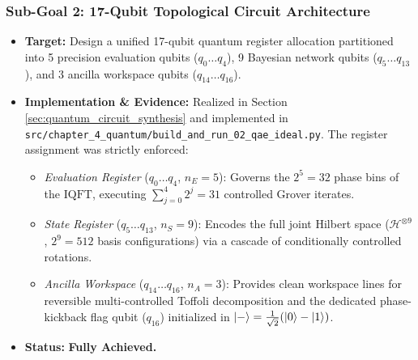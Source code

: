 \subsubsection{Sub-Goal 2: 17-Qubit Topological Circuit Architecture}
\begin{itemize}
    \item \textbf{Target:} Design a unified 17-qubit quantum register allocation partitioned into 5 precision evaluation qubits ($q_0 \dots q_4$), 9 Bayesian network qubits ($q_5 \dots q_{13}$), and 3 ancilla workspace qubits ($q_{14} \dots q_{16}$).
    \item \textbf{Implementation \& Evidence:} Realized in Section \ref{sec:quantum_circuit_synthesis} and implemented in \texttt{src/chapter\_4\_quantum/build\_and\_run\_02\_qae\_ideal.py}. The register assignment was strictly enforced:
    \begin{itemize}
        \item \emph{Evaluation Register} ($q_0 \dots q_4$, $n_E = 5$): Governs the $2^5 = 32$ phase bins of the $\mathrm{IQFT}$, executing $\sum_{j=0}^4 2^j = 31$ controlled Grover iterates.
        \item \emph{State Register} ($q_5 \dots q_{13}$, $n_S = 9$): Encodes the full joint Hilbert space ($\mathcal{H}^{\otimes 9}$, $2^9 = 512$ basis configurations) via a cascade of conditionally controlled rotations.
        \item \emph{Ancilla Workspace} ($q_{14} \dots q_{16}$, $n_A = 3$): Provides clean workspace lines for reversible multi-controlled Toffoli decomposition and the dedicated phase-kickback flag qubit ($q_{16}$) initialized in $\left|-\right\rangle = \frac{1}{\sqrt{2}}(\left|0\right\rangle - \left|1\right\rangle)$.
    \end{itemize}
    \item \textbf{Status:} \textbf{Fully Achieved.}
\end{itemize}

